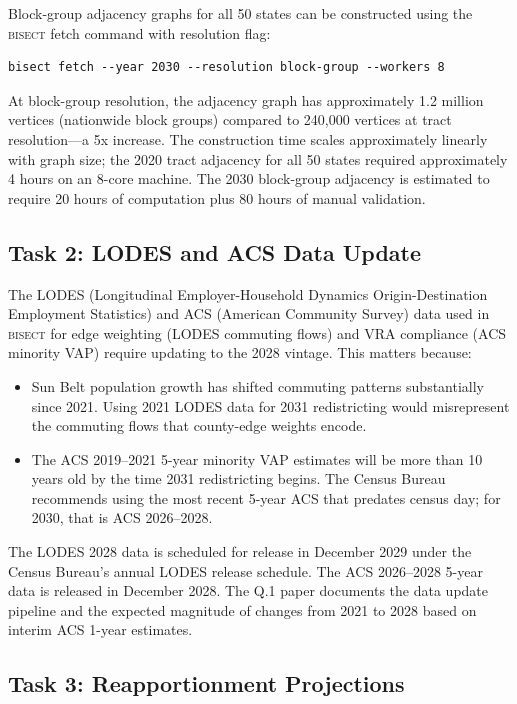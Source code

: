 Block-group adjacency graphs for all 50 states can be constructed using the
\textsc{bisect} fetch command with resolution flag:

\begin{verbatim}
bisect fetch --year 2030 --resolution block-group --workers 8
\end{verbatim}

At block-group resolution, the adjacency graph has approximately 1.2 million vertices
(nationwide block groups) compared to 240,000 vertices at tract resolution---a 5x
increase. The construction time scales approximately linearly with graph size;
the 2020 tract adjacency for all 50 states required approximately 4 hours on an
8-core machine. The 2030 block-group adjacency is estimated to require 20 hours
of computation plus 80 hours of manual validation.

\subsection{Task 2: LODES and ACS Data Update}

The LODES (Longitudinal Employer-Household Dynamics Origin-Destination Employment
Statistics) and ACS (American Community Survey) data used in \textsc{bisect} for
edge weighting (LODES commuting flows) and VRA compliance (ACS minority VAP) require
updating to the 2028 vintage. This matters because:

\begin{itemize}
\item Sun Belt population growth has shifted commuting patterns substantially since 2021.
  Using 2021 LODES data for 2031 redistricting would misrepresent the commuting flows
  that county-edge weights encode.
\item The ACS 2019--2021 5-year minority VAP estimates will be more than 10 years old
  by the time 2031 redistricting begins. The Census Bureau recommends using the most
  recent 5-year ACS that predates census day; for 2030, that is ACS 2026--2028.
\end{itemize}

The LODES 2028 data is scheduled for release in December 2029 under the Census Bureau's
annual LODES release schedule. The ACS 2026--2028 5-year data is released in December 2028.
The Q.1 paper documents the data update pipeline and the expected magnitude of changes
from 2021 to 2028 based on interim ACS 1-year estimates.

\subsection{Task 3: Reapportionment Projections}

